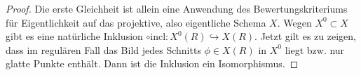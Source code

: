 \begin{Korollar}
  \begin{proof}
    Die erste Gleichheit ist allein eine Anwendung des
    Bewertungskriteriums für Eigentlichkeit auf das projektive, also
    eigentliche Schema $X$.
    Wegen $X^0\subset X$ gibt es eine natürliche Inklusion
    $\circ \text{incl}\colon X^0(R)\hookrightarrow X(R)$.
    Jetzt gilt es zu zeigen, dass im regulären Fall das Bild jedes
    Schnitts $\phi\in X(R)$ in $X^0$ liegt bzw. nur glatte Punkte
    enthält. Dann ist die Inklusion ein Isomorphismus.
    

\end{proof}
\end{Korollar}
